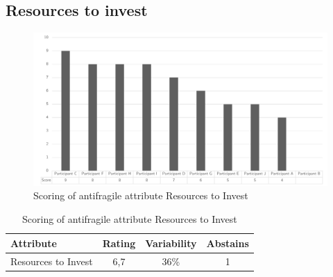 \subsection{Resources to invest}
\begin{figure}[h!]
	\centering
	\includegraphics[width=0.9\linewidth]{images/scoreafresourcestoinvest}
	\caption[Scoring of antifragile attribute Resources to Invest]{Scoring of antifragile attribute Resources to Invest}
	\label{fig:appscoringafresourcestoinvest}
\end{figure}
\begin{table}[h!]
	\centering
	\begin{tabular}{p{}ccc}
		\toprule
		\textbf{Attribute} & \textbf{Rating} & \textbf{Variability} & \textbf{Abstains} \\
		\midrule
		Resources to Invest & 6,7 & 36\% & 1 \\%
		\bottomrule
	\end{tabular}%
	\caption[Scoring of antifragile attribute Resources to Invest]{Scoring of antifragile attribute Resources to Invest}
	\label{tab:appscoringafresourcestoinvest}%
\end{table}%
\newpage
